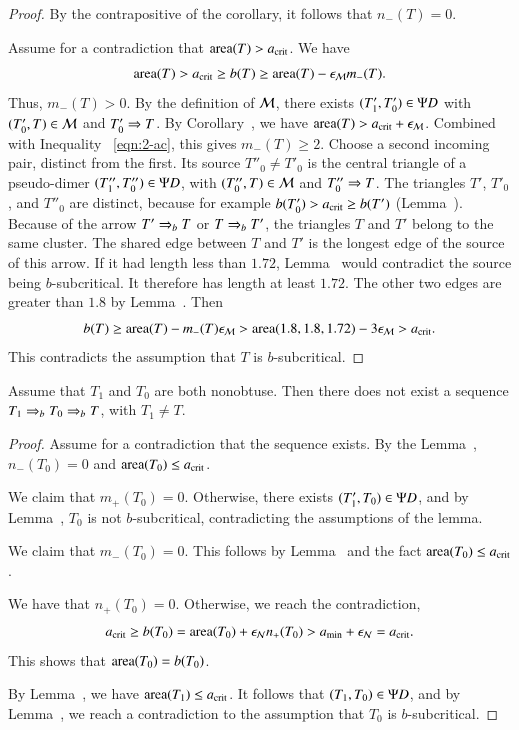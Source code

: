 \begin{proof}  
  By the contrapositive of the corollary, it follows that $n_-(T)=0$.

  Assume for a contradiction that ${\operatorname{area}}(T) > a_\text{crit}$.  We have
\begin{equation}\libel{eqn:2-ac}
\area(T) > \acrit \ge b(T) \ge \area(T) - \epsM m_-(T).
\end{equation}
Thus, $m_-(T) >0$.  By the definition of $\mathcal M$, there exists
$(T'_1,T'_0)\in\Psi D$ with $(T'_0,T)\in\mathcal M$ and $T'_0\Rightarrow T$.  By
Corollary~, we have ${\operatorname{area}}(T) >
a_\text{crit}+\epsilon_{\mathcal M}$. Combined with Inequality ~\eqref{eqn:2-ac}, this gives
$m_-(T)\ge 2$.  Choose a second incoming pair, distinct from the
first.  Its source $T''_0\ne T'_0$ is the central triangle of a
pseudo-dimer $(T''_1,T''_0)\in\Psi D$, with $(T''_0,T)\in\mathcal M$ and
$T''_0\Rightarrow T$.  The triangles $T'$, $T'_0$,
and $T''_0$ are distinct, because for example $b(T'_0) > a_\text{crit} \ge
b(T')$ (Lemma~).  Because of the arrow $T'\Rightarrow_{b} T$ or $T\Rightarrow_{b}
T'$, the triangles $T$ and $T'$ belong to the same cluster.  The
shared edge between $T$ and $T'$ is the longest edge of the source
of this arrow.  If it had length less than $1.72$,
Lemma~ would contradict the source being
$b$-subcritical.  It therefore has length at least $1.72$.  The
other two edges are greater than $1.8$ by
Lemma~.  Then
\[
b(T) \ge {\operatorname{area}}(T) - m_-(T)\epsilon_{\mathcal M} > {\operatorname{area}}(1.8,1.8,1.72) - 3\epsilon_{\mathcal M} > a_\text{crit}.
\]
This  contradicts the assumption that $T$ is $b$-subcritical.
\end{proof}

\begin{lemma}  Assume that $T_1$ and $T_0$
  are both nonobtuse.  Then there does not exist a sequence $T_1\Rightarrow_{b}
  T_0 \Rightarrow_{b} T$, with $T_1\ne T$.
\end{lemma}

\begin{proof}  
  Assume for a contradiction that the sequence exists.  By the
  Lemma~, $n_-(T_0)=0$ and ${\operatorname{area}}(T_0)\le a_\text{crit}$.

  We claim that $m_+(T_0)=0$.  Otherwise, there exists
  $(T'_1,T_0)\in\Psi D$, and by Lemma~, $T_0$ is not
  $b$-subcritical, contradicting the assumptions of the lemma.

  We claim that $m_-(T_0)=0$.  This follows by
  Lemma~ and the fact ${\operatorname{area}}(T_0)\le a_\text{crit}$.

We have that $n_+(T_0)=0$.  Otherwise, we reach the contradiction,
\[
a_\text{crit} \ge b(T_0) ={\operatorname{area}}(T_0) + \epsilon_{\mathcal N} n_+(T_0) > a_\text{min} + \epsilon_{\mathcal N} = a_\text{crit}.
\]
This shows that ${\operatorname{area}}(T_0) = b(T_0)$.

By Lemma~, we have ${\operatorname{area}}(T_1)\le a_\text{crit}$.
It follows that $(T_1,T_0)\in\Psi D$, and by Lemma~,
we reach a contradiction to the assumption that $T_0$ is $b$-subcritical. 
\end{proof}
  
